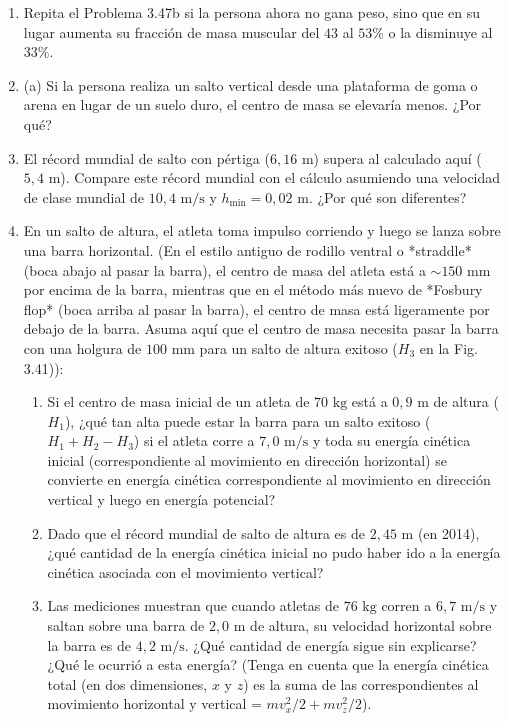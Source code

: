 \documentclass[12pt]{book}
\begin{document}
\begin{enumerate}
\item[3.48] Repita el Problema 3.47b si la persona ahora no gana peso, sino que en su lugar aumenta su fracción de masa muscular del $43$ al $53\%$ o la disminuye al $33\%$.

\item[3.49] (a) Si la persona realiza un salto vertical desde una plataforma de goma o arena en lugar de un suelo duro, el centro de masa se elevaría menos. ¿Por qué?

\item[3.50] El récord mundial de salto con pértiga ($6{,}16\text{ m}$) supera al calculado aquí ($5{,}4\text{ m}$). Compare este récord mundial con el cálculo asumiendo una velocidad de clase mundial de $10{,}4\text{ m/s}$ y $h_{\text{min}} = 0{,}02\text{ m}$. ¿Por qué son diferentes?

\item[3.51] En un salto de altura, el atleta toma impulso corriendo y luego se lanza sobre una barra horizontal. (En el estilo antiguo de rodillo ventral o *straddle* (boca abajo al pasar la barra), el centro de masa del atleta está a $\sim 150\text{ mm}$ por encima de la barra, mientras que en el método más nuevo de *Fosbury flop* (boca arriba al pasar la barra), el centro de masa está ligeramente por debajo de la barra. Asuma aquí que el centro de masa necesita pasar la barra con una holgura de $100\text{ mm}$ para un salto de altura exitoso ($H_3$ en la Fig. 3.41)):
\begin{enumerate}
\item[(a)] Si el centro de masa inicial de un atleta de $70\text{ kg}$ está a $0{,}9\text{ m}$ de altura ($H_1$), ¿qué tan alta puede estar la barra para un salto exitoso ($H_1 + H_2 - H_3$) si el atleta corre a $7{,}0\text{ m/s}$ y toda su energía cinética inicial (correspondiente al movimiento en dirección horizontal) se convierte en energía cinética correspondiente al movimiento en dirección vertical y luego en energía potencial?
\item[(b)] Dado que el récord mundial de salto de altura es de $2{,}45\text{ m}$ (en 2014), ¿qué cantidad de la energía cinética inicial no pudo haber ido a la energía cinética asociada con el movimiento vertical?
\item[(c)] Las mediciones muestran que cuando atletas de $76\text{ kg}$ corren a $6{,}7\text{ m/s}$ y saltan sobre una barra de $2{,}0\text{ m}$ de altura, su velocidad horizontal sobre la barra es de $4{,}2\text{ m/s}$. ¿Qué cantidad de energía sigue sin explicarse? ¿Qué le ocurrió a esta energía? (Tenga en cuenta que la energía cinética total (en dos dimensiones, $x$ y $z$) es la suma de las correspondientes al movimiento horizontal y vertical = $m v_x^2/2 + m v_z^2/2$).
\end{enumerate}


\end{enumerate}
\end{document}
